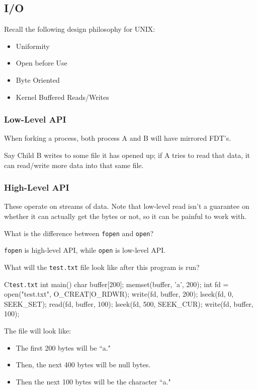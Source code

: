 \documentclass[openany]{book}
\begin{document}
\subsection{I/O}
Recall the following design philosophy for UNIX:
\begin{itemize}
	\item Uniformity
	\item Open before Use
	\item Byte Oriented
	\item Kernel Buffered Reads/Writes
\end{itemize}

\subsubsection{Low-Level API}
When forking a process, both process A and B will have mirrored FDT's.

Say Child B writes to some file it has opened up; if A tries to read that data, it can read/write more data into that same file.

\subsubsection{High-Level API}
These operate on streams of data. Note that low-level read isn't a guarantee on whether it can actually get the bytes or not, so it can be painful to work with.

\begin{hw}
	What is the difference between \texttt{fopen} and \texttt{open}?
\end{hw}
\begin{solution}
	\texttt{fopen} is high-level API, while \texttt{open} is low-level API.
\end{solution}

\begin{hw}
	What will the \texttt{test.txt} file look like after this program is run?
\end{hw}
\begin{code}{C}{\texttt{test.txt}}
int main() {
	char buffer[200];
	memset(buffer, 'a', 200);
	int fd = open("test.txt", O_CREAT|O_RDWR);
	write(fd, buffer, 200);
	lseek(fd, 0, SEEK_SET);
	read(fd, buffer, 100);
	lseek(fd, 500, SEEK_CUR);
	write(fd, buffer, 100);
}
\end{code}

\begin{solution}
	The file will look like:
	\begin{itemize}
		\item The first 200 bytes will be ``a."
		\item Then, the next 400 bytes will be null bytes.
		\item Then the next 100 bytes will be the character ``a."
	\end{itemize}
\end{solution}
\end{document}
